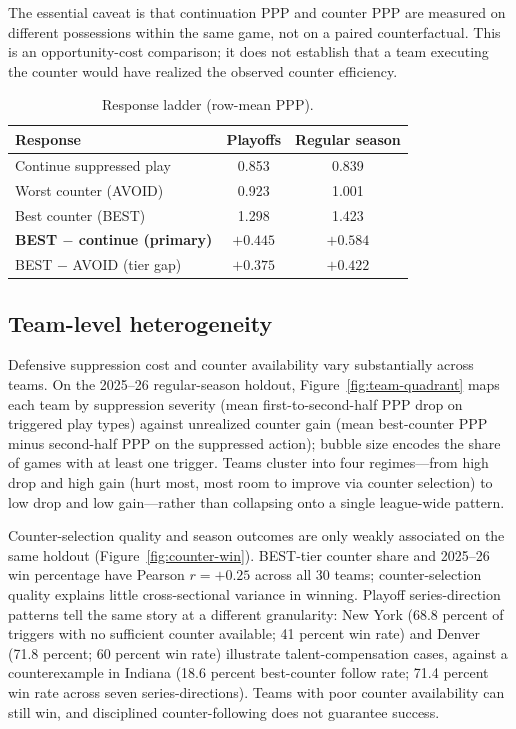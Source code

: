 \documentclass[11pt]{article}
\begin{document}
The essential caveat is that continuation PPP and counter PPP are measured on different possessions within the same game, not on a paired counterfactual. This is an opportunity-cost comparison; it does not establish that a team executing the counter would have realized the observed counter efficiency.

\begin{table}[t]
\centering
\caption{Response ladder (row-mean PPP).}
\label{tab:ladder}
\begin{tabular}{lcc}
\toprule
Response & Playoffs & Regular season \\
\midrule
Continue suppressed play & 0.853 & 0.839 \\
Worst counter (AVOID) & 0.923 & 1.001 \\
Best counter (BEST) & 1.298 & 1.423 \\
\textbf{BEST $-$ continue (primary)} & \textbf{$+0.445$} & \textbf{$+0.584$} \\
BEST $-$ AVOID (tier gap) & $+0.375$ & $+0.422$ \\
\bottomrule
\end{tabular}
\end{table}

\subsection{Team-level heterogeneity}

Defensive suppression cost and counter availability vary substantially across teams. On the 2025--26 regular-season holdout, Figure~\ref{fig:team-quadrant} maps each team by suppression severity (mean first-to-second-half PPP drop on triggered play types) against unrealized counter gain (mean best-counter PPP minus second-half PPP on the suppressed action); bubble size encodes the share of games with at least one trigger. Teams cluster into four regimes---from high drop and high gain (hurt most, most room to improve via counter selection) to low drop and low gain---rather than collapsing onto a single league-wide pattern.

Counter-selection quality and season outcomes are only weakly associated on the same holdout (Figure~\ref{fig:counter-win}). BEST-tier counter share and 2025--26 win percentage have Pearson $r = +0.25$ across all 30 teams; counter-selection quality explains little cross-sectional variance in winning. Playoff series-direction patterns tell the same story at a different granularity: New York (68.8 percent of triggers with no sufficient counter available; 41 percent win rate) and Denver (71.8 percent; 60 percent win rate) illustrate talent-compensation cases, against a counterexample in Indiana (18.6 percent best-counter follow rate; 71.4 percent win rate across seven series-directions). Teams with poor counter availability can still win, and disciplined counter-following does not guarantee success.
\end{document}
